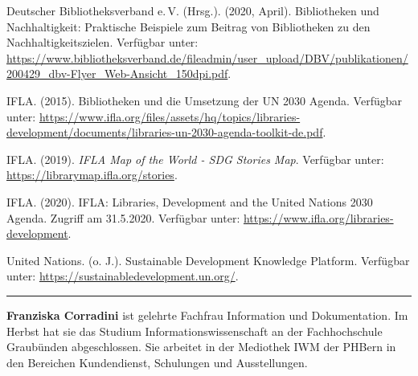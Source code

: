 \documentclass[a4paper,
fontsize=11pt,
oneside,
numbers=noperiodatend,
parskip=half-,
bibliography=totoc,
final
]{scrartcl}
\begin{document}
Deutscher Bibliotheksverband e.\,V. (Hrsg.). (2020, April). Bibliotheken
und Nachhaltigkeit: Praktische Beispiele zum Beitrag von Bibliotheken zu
den Nachhaltigkeitszielen. Verfügbar unter:
\url{https://www.bibliotheksverband.de/fileadmin/user_upload/DBV/publikationen/200429_dbv-Flyer_Web-Ansicht_150dpi.pdf}.

IFLA. (2015). Bibliotheken und die Umsetzung der UN 2030 Agenda.
Verfügbar unter:
\url{https://www.ifla.org/files/assets/hq/topics/libraries-development/documents/libraries-un-2030-agenda-toolkit-de.pdf}.

IFLA. (2019). \emph{IFLA Map of the World - SDG Stories Map}. Verfügbar
unter: \url{https://librarymap.ifla.org/stories}.

IFLA. (2020). IFLA: Libraries, Development and the United Nations 2030
Agenda. Zugriff am 31.5.2020. Verfügbar unter:
\url{https://www.ifla.org/libraries-development}.

United Nations. (o. J.). Sustainable Development Knowledge Platform.
Verfügbar unter: \url{https://sustainabledevelopment.un.org/}.

\begin{center}\rule{0.5\linewidth}{0.5pt}\end{center}

\textbf{Franziska Corradini} ist gelehrte Fachfrau Information und
Dokumentation. Im Herbst hat sie das Studium Informationswissenschaft an
der Fachhochschule Graubünden abgeschlossen. Sie arbeitet in der
Mediothek IWM der PHBern in den Bereichen Kundendienst, Schulungen und
Ausstellungen.
\end{document}
